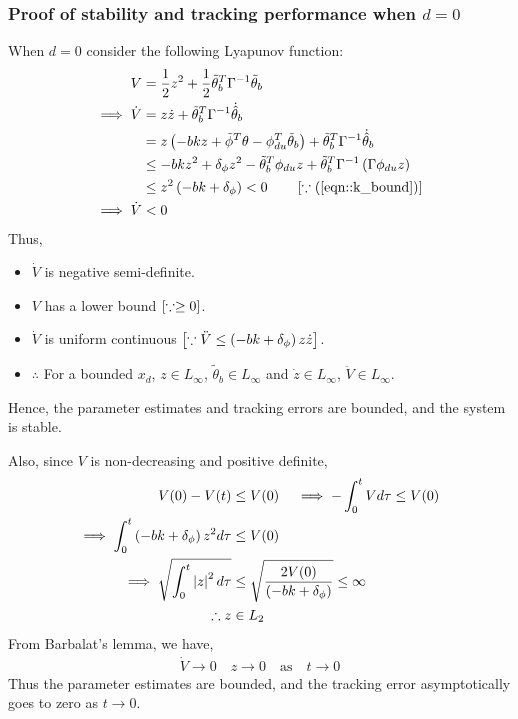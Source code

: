 \subsubsection{Proof of stability and tracking performance when $d = 0$}

When $d = 0$ consider the following Lyapunov function:
\begin{align*}
    V &= \frac{1}{2} z^2 + \frac{1}{2} \tilde{\theta}_b^T \Gamma^{-1} \tilde{\theta}_b\\
    \implies \dot V &= z \dot z + \tilde \theta_b^T \Gamma^{-1} \dot{\hat \theta}_b\\
    &= z \left( - bk z +  \tilde \phi^T \theta - \phi_{du}^T \tilde \theta_b \right)+ \tilde \theta_b^T \Gamma^{-1} \dot{\hat \theta}_b\\
    &\leq -bkz^2 + \delta_\phi z^2 - \tilde \theta_b^T \phi_{du} z + \tilde \theta_b^T \Gamma^{-1} \left( \Gamma \phi_{du} z \right)\\
    &\leq z^2 \left( -bk + \delta_\phi \right) < 0 \qquad \left[ \because (\ref{eqn::k_bound}) \right]\\
    \implies \dot V &< 0
\end{align*}
Thus,
\begin{itemize}
    \item $\dot V$ is negative semi-definite.
    \item $V$ has a lower bound $ \left[ \because \geq 0 \right]$.
\item $\dot V$ is uniform continuous $\left[ \because \ddot V \leq \left( -bk +
\delta_\phi \right)z \dot z  \right]$.
    \item $\therefore$ For a bounded $x_d$, $z \in L_\infty$, $\tilde{
    \theta}_b \in L_{\infty}$ and $\dot z \in L_\infty$, $\ddot V \in L_\infty$.
\end{itemize}

Hence, the parameter estimates and tracking errors are bounded, and the system
is stable.

Also, since $V$ is non-decreasing and positive definite,
\begin{align*}
    V(0) - V(t) &\leq V(0) \quad
    \implies -\int_0^t V d \tau \leq V(0)\\
    \implies \int_0^t \left( -bk + \delta_\phi \right) z^2 d \tau &\leq V(0)\\
    \implies \sqrt{\int_0^t \left\lvert z \right\rvert^2 d \tau } &\leq \sqrt{\frac{2 V(0)}{\left( -bk + \delta_\phi \right)}} \leq \infty\\
    \therefore z &\in L_2
\end{align*}
From Barbalat's lemma, we have,
\begin{align*}
    \dot V \rightarrow 0 \quad z \rightarrow 0 \quad \text{as} \quad t \rightarrow 0
\end{align*}
Thus the parameter estimates are bounded, and the tracking error asymptotically
goes to zero as  $t \rightarrow 0$.
